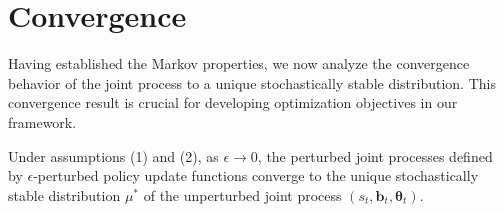 \section{Convergence}
Having established the Markov properties, we now analyze the convergence
behavior of the joint process to a unique stochastically stable distribution. This
convergence result is crucial for developing optimization objectives in our framework.
\begin{theorem}
    Under assumptions (1) and (2), as $\epsilon \to 0$, the perturbed joint processes
    defined by $\epsilon$-perturbed policy update functions converge to the unique
    stochastically stable distribution $\mu^{*}$ of the unperturbed joint process $(
        s_{t}, \boldsymbol{b}_{t}, \boldsymbol{\theta}_{t})$.
\end{theorem}

